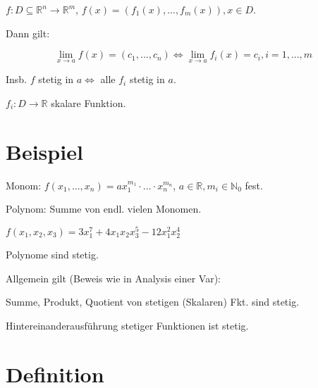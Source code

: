 \documentclass[a4paper, openany]{book}
\begin{document}
          $f: D \subseteq \mathbb{R}^n \rightarrow \mathbb{R}^m$, $f(x) = (f_1(x), ..., f_m(x)), x \in D$.

          Dann gilt:

          \[ \lim_{x \rightarrow a} f(x) = (c_1, ..., c_n) \Leftrightarrow \lim_{x \rightarrow a} f_i(x) = c_i, i=1, ...,m \]

          Insb. $f$ stetig in $a \Leftrightarrow$ alle $f_i$ stetig in $a$.

          \par \medskip

          $f_i : D \rightarrow \mathbb{R}$ skalare Funktion.

          \section{Beispiel}

          Monom: $f(x_1, ..., x_n) = ax_1^{m_1} \cdot ... \cdot x_n^{m_n}$, $a \in \mathbb{R}, m_i \in \mathbb{N}_0$ fest.

          \par \medskip

          Polynom: Summe von endl. vielen Monomen.

          \par \medskip

          $f(x_1, x_2, x_3) = 3x_1^7 + 4x_1x_2x_3^5 - 12x_1^2x_2^4$

          Polynome sind stetig.

          \par \medskip

          Allgemein gilt (Beweis wie in Analysis einer Var):

          Summe, Produkt, Quotient von stetigen (Skalaren) Fkt. sind stetig.

          \par \medskip

          Hintereinanderausführung stetiger Funktionen ist stetig. 

          \section{Definition}
\end{document}
